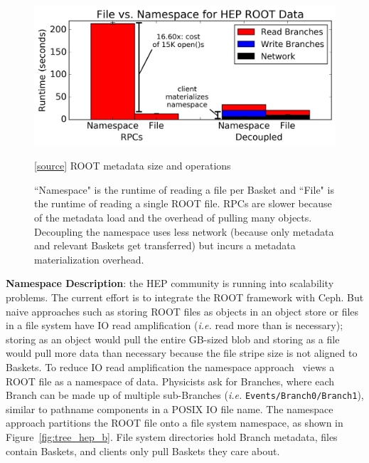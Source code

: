 \begin{figure}[tb]
    \centering
    \includegraphics[width=1\linewidth]{./chapters/tintenfisch/figures/hep_runtime.png}
    \caption{
    [\href{https://github.com/michaelsevilla/tintenfisch-popper/blob/master/pipelines/hep/visualize/viz.ipynb}{source}]
    ROOT metadata size and operations}
    \label{fig:hep_runtime}
\caption{``Namespace" is the runtime of reading a file per Basket and ``File"
is the runtime of reading a single ROOT file. RPCs are slower because of the
metadata load and the overhead of pulling many objects.  Decoupling the
namespace uses less network (because only metadata and relevant Baskets get
transferred) but incurs a metadata materialization overhead.}
\end{figure}

\textbf{Namespace Description}: the HEP community is running into scalability
problems.  The current effort is to integrate the ROOT framework with Ceph. But
naive approaches such as storing ROOT files as objects in an object store or
files in a file system have IO read amplification ({\it i.e.} read more than is
necessary); storing as an object would pull the entire GB-sized blob and
storing as a file would pull more data than necessary because the file stripe
size is not aligned to Baskets.  To reduce IO read amplification the namespace
approach~\cite{pivarski:indico17-root} views a ROOT file as a namespace of
data.  Physicists ask for Branches, where each Branch can be made up of
multiple sub-Branches ({\it i.e.} \texttt{Events/Branch0/Branch1}), similar to
pathname components in a POSIX IO file name. The namespace approach
partitions the ROOT file onto a file system namespace, as shown in
Figure~\ref{fig:tree_hep_b}. File system directories hold Branch metadata,
files contain Baskets, and clients only pull Baskets they care about.


